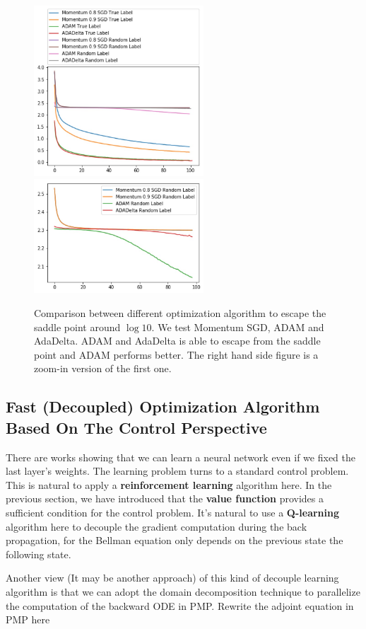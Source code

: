 \documentclass{article}
\theoremstyle{plain}
\theoremstyle{definition}
\begin{document}
\begin{figure}[H]
	\centering
	\includegraphics[width=2.5in]{opt.jpg}
	\includegraphics[width=2.5in]{saddle.jpg}
	\caption{Comparison between different optimization algorithm to escape the saddle point around $\log 10$. We test Momentum SGD, ADAM and AdaDelta. ADAM and AdaDelta is able to escape from the saddle point and ADAM performs better. The right hand side figure is a zoom-in version of the first one.}
	\label{optsadd}
\end{figure}

\subsection{Fast (Decoupled) Optimization Algorithm Based On The Control Perspective}

There are works showing that we can learn a neural network even if we fixed the last layer's weights. The learning problem turns to a standard control problem. This is natural to apply a \textbf{reinforcement learning} algorithm here. In the previous section, we have introduced that the \textbf{value function} provides a sufficient condition for the control problem. It's natural to use a \textbf{Q-learning} algorithm here to decouple the gradient computation during the back propagation, for the Bellman equation only depends on the previous state the following state.


Another view (It may be another approach) of this kind of decouple learning algorithm is that we can adopt the domain decomposition technique to parallelize the computation of the backward ODE in PMP. Rewrite the adjoint equation in PMP here
\end{document}
